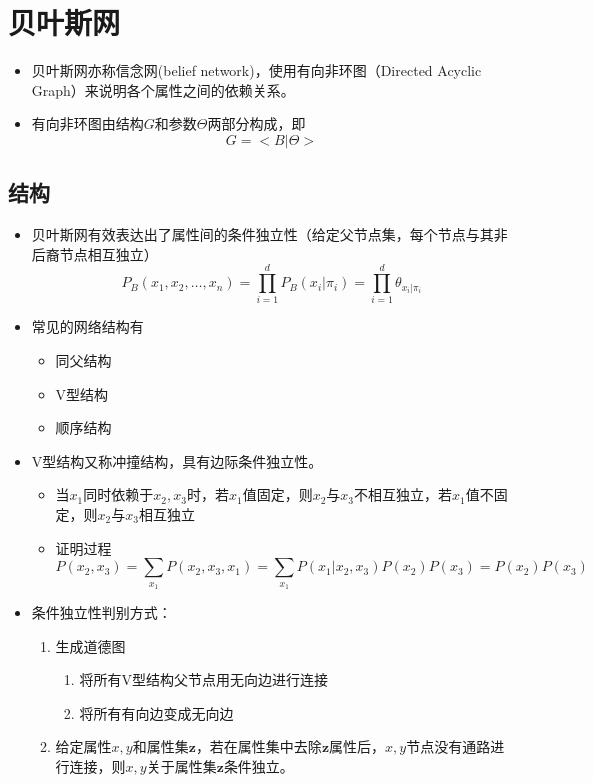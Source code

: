 \section{贝叶斯网}

\begin{itemize}
\item 贝叶斯网亦称信念网(belief network)，使用有向非环图（Directed Acyclic Graph）来说明各个属性之间的依赖关系。
\item 有向非环图由结构$G$和参数$\Theta$两部分构成，即
\begin{equation}
G=<B|\Theta>
\end{equation}
\end{itemize}

\subsection{结构}

\begin{itemize}
\item 贝叶斯网有效表达出了属性间的条件独立性（给定父节点集，每个节点与其非后裔节点相互独立）
\begin{equation}
P_B(x_1,x_2,\dots,x_n)=\prod_{i=1}^{d}P_B(x_i|\pi_i)=\prod_{i=1}^d\theta_{x_i|\pi_i}
\end{equation}
\item 常见的网络结构有
    \begin{itemize}
    \item 同父结构
    \item V型结构
    \item 顺序结构
    \end{itemize}
\item V型结构又称冲撞结构，具有边际条件独立性。
    \begin{itemize}
    \item 当$x_1$同时依赖于$x_2,x_3$时，若$x_1$值固定，则$x_2$与$x_3$不相互独立，若$x_1$值不固定，则$x_2$与$x_3$相互独立
    \item 证明过程\begin{equation}P(x_2,x_3)=\sum_{x_1}P(x_2,x_3,x_1)=\sum_{x_1}P(x_1|x_2,x_3)P(x_2)P(x_3)=P(x_2)P(x_3)\end{equation}
    \end{itemize}
\item 条件独立性判别方式：
    \begin{enumerate}
    \item 生成道德图
        \begin{enumerate}
        \item 将所有V型结构父节点用无向边进行连接
        \item 将所有有向边变成无向边
        \end{enumerate}
    \item 给定属性$x,y$和属性集$\bm{z}$，若在属性集中去除$\bm{z}$属性后，$x,y$节点没有通路进行连接，则$x,y$关于属性集$\bm{z}$条件独立。
    \end{enumerate}
\end{itemize}

